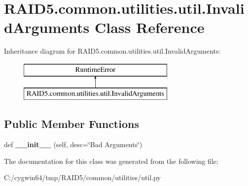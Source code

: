 \hypertarget{class_r_a_i_d5_1_1common_1_1utilities_1_1util_1_1_invalid_arguments}{}\section{R\+A\+I\+D5.\+common.\+utilities.\+util.\+Invalid\+Arguments Class Reference}
\label{class_r_a_i_d5_1_1common_1_1utilities_1_1util_1_1_invalid_arguments}
Inheritance diagram for R\+A\+I\+D5.\+common.\+utilities.\+util.\+Invalid\+Arguments\+:\begin{figure}[H]
\begin{center}
\leavevmode
\includegraphics[height=2.000000cm]{class_r_a_i_d5_1_1common_1_1utilities_1_1util_1_1_invalid_arguments}
\end{center}
\end{figure}
\subsection*{Public Member Functions}
\begin{DoxyCompactItemize}
\item 
\mbox{\label{class_r_a_i_d5_1_1common_1_1utilities_1_1util_1_1_invalid_arguments_a3df9ef60674910823a5c428ac26078f2}} 
def {\bfseries \+\_\+\+\_\+init\+\_\+\+\_\+} (self, desc=\char`\"{}Bad Arguments\char`\"{})
\end{DoxyCompactItemize}


The documentation for this class was generated from the following file\+:\begin{DoxyCompactItemize}
\item 
C\+:/cygwin64/tmp/\+R\+A\+I\+D5/common/utilities/util.\+py\end{DoxyCompactItemize}

